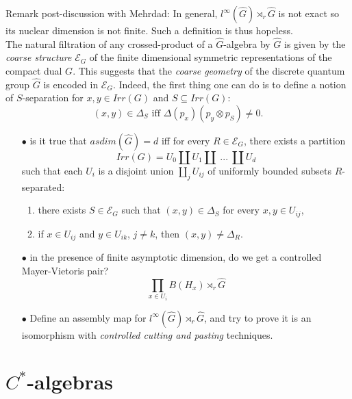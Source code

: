 Remark post-discussion with Mehrdad: In general, $l^\infty (\hat G) \rtimes_r \hat G$ is not exact so its nuclear dimension is not finite. Such a definition is thus hopeless.\\

The natural filtration of any crossed-product of a $\hat G$-algebra by $\hat G$ is given by the \textit{coarse structure} $\mathcal E_G$ of the finite dimensional symmetric representations of the compact dual $G$. This suggests that the \textit{coarse geometry} of the discrete quantum group $\hat G$ is encoded in $\mathcal E_G$. Indeed, the first thing one can do is to define a notion of $S$-separation for $x,y\in Irr(G)$ and $S\subseteq Irr(G)$:
\[(x,y )\in \Delta_S  \text{ iff } \Delta(p_x) (p_y \otimes p_S)\neq 0.\] 

\begin{itemize}
\item[$\bullet$] is it true that $asdim(\hat G)=d$ iff for every $R\in \mathcal E_G$, there exists a partition
\[Irr(G) = U_0 \coprod U_1 \coprod \ ... \ \coprod U_d\]
such that each $U_i$ is a disjoint union $\coprod_j U_{ij}$ of uniformly bounded subsets $R$-separated:
\begin{enumerate}
\item there exists $S\in \mathcal E_G$ such that $(x,y)\in \Delta_S$ for every $x,y \in U_{ij}$,
\item if $x\in U_{ij}$ and $y\in U_{ik}$, $j\neq k$, then $(x,y)\neq \Delta_R$.\\
\end{enumerate}

\item[$\bullet$] in the presence of finite asymptotic dimension, do we get a controlled Mayer-Vietoris pair? 
\[ \prod_{x\in U_i} B(H_x) \rtimes_r \hat G\]

\item[$\bullet$] Define an assembly map for $l^\infty(\hat G)\rtimes_r \hat G$, and try to prove it is an isomorphism with \textit{controlled cutting and pasting} techniques.
\end{itemize}

\newpage

\section{$C^*$-algebras}


